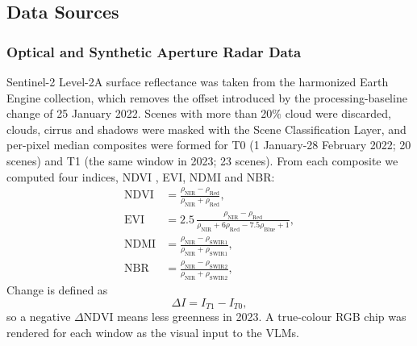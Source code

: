 \documentclass[11pt]{article}
\begin{document}

\subsection{Data Sources}

\subsubsection{Optical and Synthetic Aperture Radar Data}

Sentinel-2 Level-2A surface reflectance \citep{drusch2012} was taken
from the harmonized Earth Engine collection, which removes the offset
introduced by the processing-baseline change of 25 January 2022. Scenes
with more than 20\% cloud were discarded, clouds, cirrus and shadows were
masked with the Scene Classification Layer, and per-pixel median
composites were formed for T0 (1 January-28 February 2022; 20 scenes)
and T1 (the same window in 2023; 23 scenes). From each composite we
computed four indices, NDVI \citep{tucker1979}, EVI, NDMI and NBR:
\begin{align}
\mathrm{NDVI} &= \frac{\rho_{\mathrm{NIR}}-\rho_{\mathrm{Red}}}{\rho_{\mathrm{NIR}}+\rho_{\mathrm{Red}}}, \label{eq:ndvi}\\
\mathrm{EVI} &= 2.5\,\frac{\rho_{\mathrm{NIR}}-\rho_{\mathrm{Red}}}{\rho_{\mathrm{NIR}}+6\rho_{\mathrm{Red}}-7.5\rho_{\mathrm{Blue}}+1}, \label{eq:evi}\\
\mathrm{NDMI} &= \frac{\rho_{\mathrm{NIR}}-\rho_{\mathrm{SWIR1}}}{\rho_{\mathrm{NIR}}+\rho_{\mathrm{SWIR1}}}, \label{eq:ndmi}\\
\mathrm{NBR} &= \frac{\rho_{\mathrm{NIR}}-\rho_{\mathrm{SWIR2}}}{\rho_{\mathrm{NIR}}+\rho_{\mathrm{SWIR2}}}, \label{eq:nbr}
\end{align}
Change is defined as
\begin{equation}
\Delta I = I_{T1}-I_{T0},
\label{eq:delta}
\end{equation}
so a negative $\Delta\mathrm{NDVI}$ means less greenness in 2023. A
true-colour RGB chip was rendered for each window as the visual input to
the VLMs.
\end{document}
